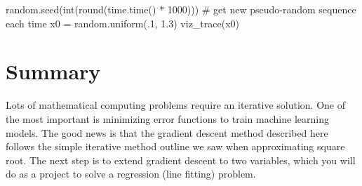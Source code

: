 \documentclass[titlepage]{tufte-book}
\newcounter{problem}
\begin{document}
\begin{fullwidth}
\begin{pyverbatim}
random.seed(int(round(time.time() * 1000))) # get new pseudo-random sequence each time
x0 = random.uniform(.1, 1.3)
viz_trace(x0)
\end{pyverbatim}
 
\section{Summary}

Lots of mathematical computing problems require an iterative solution. One of the most important is minimizing error functions to train machine learning models. The good news is that the gradient descent method described here follows the simple iterative method outline we saw when approximating square root. The next step is to extend gradient descent to two variables, which you will do as a project to solve a regression (line fitting) problem.

\end{fullwidth}
\end{document}

